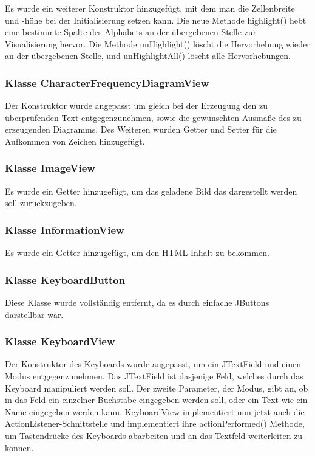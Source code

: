 \documentclass{article}
\begin{document}
	Es wurde ein weiterer Konstruktor hinzugefügt, mit dem man die Zellenbreite und -höhe
	bei der Initialisierung setzen kann. Die neue Methode highlight() hebt eine bestimmte
	Spalte des Alphabets an der übergebenen Stelle zur Visualisierung hervor. Die Methode 
	unHighlight() löscht die Hervorhebung wieder an der übergebenen Stelle, und unHighlightAll() 
	löscht alle Hervorhebungen.

	\subsubsection{Klasse CharacterFrequencyDiagramView}

	Der Konstruktor wurde angepasst um gleich bei der Erzeugung den zu überprüfenden Text
	entgegenzunehmen, sowie die gewünschten Ausmaße des zu erzeugenden Diagramms. Des Weiteren
	wurden Getter und Setter für die Aufkommen von Zeichen hinzugefügt.

	\subsubsection{Klasse ImageView}

	Es wurde ein Getter hinzugefügt, um das geladene Bild das dargestellt werden soll zurückzugeben.

	\subsubsection{Klasse InformationView}

	Es wurde ein Getter hinzugefügt, um den HTML Inhalt zu bekommen.

	\subsubsection{Klasse KeyboardButton}

	Diese Klasse wurde vollständig entfernt, da es durch einfache JButtons darstellbar war.

	\subsubsection{Klasse KeyboardView}

	Der Konstruktor des Keyboards wurde angepasst, um ein JTextField und einen Modus entgegenzunehmen.
	Das JTextField ist dasjenige Feld, welches durch das Keyboard manipuliert werden soll. Der zweite
	Parameter, der Modus, gibt an, ob in das Feld ein einzelner Buchstabe eingegeben werden soll, oder
	ein Text wie ein Name eingegeben werden kann. KeyboardView implementiert nun jetzt auch die
	ActionListener-Schnittstelle und implementiert ihre actionPerformed() Methode, um Tastendrücke
	des Keyboards abarbeiten und an das Textfeld weiterleiten zu können.
\end{document}
